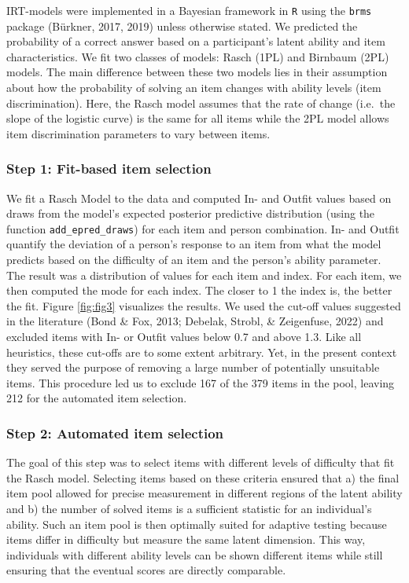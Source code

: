 \documentclass[
  man,floatsintext]{apa6}
\begin{document}
IRT-models were implemented in a Bayesian framework in \texttt{R} using the \texttt{brms} package (Bürkner, 2017, 2019) unless otherwise stated. We predicted the probability of a correct answer based on a participant's latent ability and item characteristics. We fit two classes of models: Rasch (1PL) and Birnbaum (2PL) models. The main difference between these two models lies in their assumption about how the probability of solving an item changes with ability levels (item discrimination). Here, the Rasch model assumes that the rate of change (i.e.~the slope of the logistic curve) is the same for all items while the 2PL model allows item discrimination parameters to vary between items.

\hypertarget{step-1-fit-based-item-selection}{%
\subsubsection{Step 1: Fit-based item selection}\label{step-1-fit-based-item-selection}}

We fit a Rasch Model to the data and computed In- and Outfit values based on draws from the model's expected posterior predictive distribution (using the function \texttt{add\_epred\_draws}) for each item and person combination. In- and Outfit quantify the deviation of a person's response to an item from what the model predicts based on the difficulty of an item and the person's ability parameter. The result was a distribution of values for each item and index. For each item, we then computed the mode for each index. The closer to 1 the index is, the better the fit. Figure \ref{fig:fig3} visualizes the results. We used the cut-off values suggested in the literature (Bond \& Fox, 2013; Debelak, Strobl, \& Zeigenfuse, 2022) and excluded items with In- or Outfit values below 0.7 and above 1.3. Like all heuristics, these cut-offs are to some extent arbitrary. Yet, in the present context they served the purpose of removing a large number of potentially unsuitable items. This procedure led us to exclude 167 of the 379 items in the pool, leaving 212 for the automated item selection.

\hypertarget{step-2-automated-item-selection}{%
\subsubsection{Step 2: Automated item selection}\label{step-2-automated-item-selection}}

The goal of this step was to select items with different levels of difficulty that fit the Rasch model. Selecting items based on these criteria ensured that a) the final item pool allowed for precise measurement in different regions of the latent ability and b) the number of solved items is a sufficient statistic for an individual's ability. Such an item pool is then optimally suited for adaptive testing because items differ in difficulty but measure the same latent dimension. This way, individuals with different ability levels can be shown different items while still ensuring that the eventual scores are directly comparable.
\end{document}
